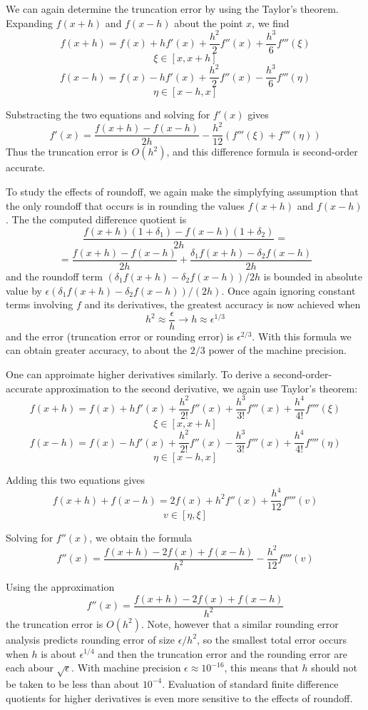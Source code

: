 We can again determine the truncation error by using the Taylor's theorem. Expanding $f(x + h)$ and $f(x - h)$ about the point $x$, we find
\[ f(x + h) = f(x) + h f'(x) + \frac{h^2}{2} f''(x) + \frac{h^3}{6} f'''(\xi) \]
\[ \xi \in [x, x+h] \]
\[ f(x - h) = f(x) - h f'(x) + \frac{h^2}{2} f''(x) - \frac{h^3}{6} f'''(\eta) \]
\[ \eta \in [x-h, x] \]

Substracting the two equations and solving for $f'(x)$ gives
\[ f'(x) = \frac{f(x + h) - f(x - h)}{2h} - \frac{h^2}{12} (f'''(\xi) + f'''(\eta)) \]
Thus the truncation error is $O(h^2)$, and this difference formula is second-order accurate.

To study the effects of roundoff, we again make the simplyfying assumption that the only roundoff that occurs is in rounding the values $f(x + h)$ and $f(x - h)$. The the computed difference quotient is
\[ \frac{f(x + h) (1 + \delta_1) - f(x - h)(1 + \delta_2)}{2h} = \]
\[ = \frac{f(x + h) - f(x - h)}{2h} + \frac{\delta_1 f(x + h) - \delta_2 f(x - h)}{2h} \]
and the roundoff term $(\delta_1 f(x + h) - \delta_2 f(x - h)) / 2h$ is bounded in absolute value by $\epsilon (\delta_1 f(x + h) - \delta_2 f(x - h)) / (2h)$. Once again ignoring constant terms involving $f$ and its derivatives, the greatest accuracy is now achieved when
\[ h^2 \approx \frac{\epsilon}{h} \rightarrow h \approx \epsilon^{1/3} \]
and the error (truncation error or rounding error) is $\epsilon^{2/3}$. With this formula we can obtain greater accuracy, to about the $2/3$ power of the machine precision.

One can approimate higher derivatives similarly. To derive a second-order-accurate approximation to the second derivative, we again use Taylor's theorem:
\[ f(x + h)  = f(x) + h f'(x) + \frac{h^2}{2!} f''(x) + \frac{h^3}{3!} f'''(x) + \frac{h^4}{4!} f''''(\xi) \]
\[ \xi \in [x, x+h] \]
\[ f(x - h) = f(x) - h f'(x) + \frac{h^2}{2!} f''(x) - \frac{h^3}{3!} f'''(x) + \frac{h^4}{4!} f''''(\eta) \]
\[ \eta \in [x - h, x] \]

Adding this two equations gives
\[ f(x + h) + f(x - h) = 2 f(x) + h^2 f''(x) + \frac{h^4}{12} f''''(v) \]
\[ v \in [\eta, \xi] \]

Solving for $f''(x)$, we obtain the formula
\[ f''(x) = \frac{f(x + h) - 2 f(x) + f(x - h)}{h^2} - \frac{h^2}{12} f''''(v)\]

Using the approximation
\begin{equation}
    f''(x) = \frac{f(x + h) - 2 f(x) + f(x - h)}{h^2}
    \label{Eq: (9.3)}
\end{equation}
the truncation error is $O(h^2)$. Note, however that a similar rounding error analysis predicts rounding error of size $\epsilon / h^2$, so the smallest total error occurs when $h$ is about $\epsilon^{1/4}$ and then the truncation error and the rounding error are each abour $\sqrt{\epsilon}$. With machine precision $\epsilon \approx 10^{-16}$, this means that $h$ should not be taken to be less than about $10^{-4}$. Evaluation of standard finite difference quotients for higher derivatives is even more sensitive to the effects of roundoff.